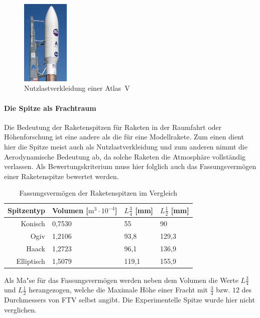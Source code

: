 \documentclass[10pt,a4paper]{article}
\begin{document}
\begin{figure}
	\vspace{-12pt}
	\includegraphics[width=0.2\textwidth]{Bilder/Atlas-V.jpg}
	\caption{Nutzlastverkleidung einer Atlas~V \cite{wik}}
	\label{fig-Nutzlastverkleidung}
	\vspace{-130pt}
\end{figure}

\paragraph{Die Spitze als Frachtraum}
Die Bedeutung der Raketenspitzen für Raketen in der Raumfahrt oder Höhenforschung ist eine andere als die für eine Modellrakete. Zum einen dient hier die Spitze meist auch als Nutzlastverkleidung und zum anderen nimmt die Aerodynamische Bedeutung ab, da solche Raketen die Atmosphäre vollständig verlassen. Als Bewertungskriterium muss hier folglich auch das Fassungsvermögen einer Raketenspitze bewertet werden.

\begin{table}[h]
\centering
\caption{Fassungsvermögen der Raketenspitzen im Vergleich}
\begin{tabular}{r|lll}
	\toprule
	Spitzentyp	& Volumen [$\text{m}^{3} \cdot 10^{-4}$]	& $L \tfrac{3}{4}$ [mm]	& $L \tfrac{1}{2}$ [mm]\\
	\midrule
	Konisch		& 0,7530 & 55	& 90 \\
	Ogiv		& 1,2106 & 93,8	& 129,3 \\
	Haack		& 1,2723 & 96,1	& 136,9 \\
	Elliptisch	& 1,5079 & 119,1& 155,9 \\
	\bottomrule
\end{tabular}
\end{table}

\noindent
Als Ma"se für das Fassungsvermögen werden neben dem Volumen die Werte $L \tfrac{3}{4}$ und $L \tfrac{1}{2}$ herangezogen, welche die Maximale Höhe einer Fracht mit $\tfrac{3}{4}$ bzw. ${1}{2}$ des Durchmessers von FTV selbst angibt. Die Experimentelle Spitze wurde hier nicht verglichen.
\end{document}
